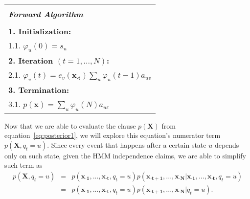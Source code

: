 \begin{center}
  \begin{spacing}{1.0}
    \begin{tabular}{l}
      \hline \\[-0.25cm]
      \hspace{1.3cm} {\large {\bf \emph{ Forward Algorithm } } } \hspace{1.3cm} \\[0.1cm]
      \hline \\[-0.25cm]
      \hspace{0.2cm} {\bf 1. Initialization:} \\
      \hspace{0.9cm} 1.1. $ \varphi_u(0) = s_u $ \\
      \hspace{0.2cm} {\bf 2. Iteration $ (t = 1, ..., N) $:} \\
      \hspace{0.9cm} 2.1. $ \varphi_v(t) = e_v(\mathbf{{x}_{\cdot t}}) \sum_{u}{\varphi_u(t-1) a_{uv}} $ \\
      \hspace{0.2cm} {\bf 3. Termination:} \\
      \hspace{0.9cm} 3.1. $ p(\mathbf{x}) = \sum_{u}{\varphi_u(N) a_{u\varepsilon}} $ \\[0.1cm]
      \hline
    \end{tabular}
  \end{spacing}
\end{center}

Now that we are able to evaluate the clause $ p(\mathbf{X}) $ from equation~\ref{eq:posterior1}, we will explore this equation's numerator term $ p(\mathbf{X}, q_t = u) $. Since every event that happens after a certain state $ u $ depends only on such state, given the HMM independence claims, we are able to simplify such term as
\begin{equation}
  \label{eq:posterior5}
  \begin{array}{lcl} 
    p(\mathbf{X}, q_t = u) & = & p(\mathbf{{x}_{\cdot 1}}, ..., \mathbf{{x}_{\cdot t}}, q_t = u) p(\mathbf{{x}_{\cdot t+1}}, ..., \mathbf{{x}_{\cdot N}} | \mathbf{{x}_{\cdot 1}}, ..., \mathbf{{x}_{\cdot t}}, q_t = u) \\ 
                    & = & p(\mathbf{{x}_{\cdot 1}}, ..., \mathbf{{x}_{\cdot t}}, q_t = u) p(\mathbf{{x}_{\cdot t+1}}, ..., \mathbf{{x}_{\cdot N}} | q_t = u).
  \end{array}
\end{equation}


